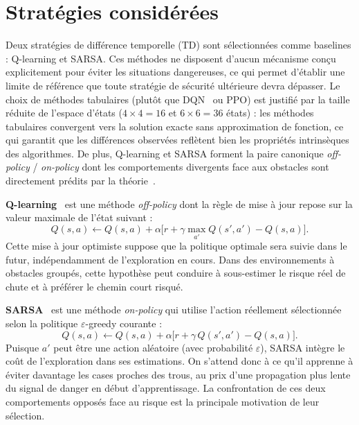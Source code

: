 \documentclass{article}
\begin{document}
\section{Stratégies considérées}

Deux stratégies de différence temporelle (TD) sont sélectionnées comme baselines : Q-learning et SARSA. Ces méthodes ne disposent d'aucun mécanisme conçu explicitement pour éviter les situations dangereuses, ce qui permet d'établir une limite de référence que toute stratégie de sécurité ultérieure devra dépasser. Le choix de méthodes tabulaires (plutôt que DQN~\citep{mnih2015} ou PPO) est justifié par la taille réduite de l'espace d'états ($4\times4 = 16$ et $6\times6 = 36$ états) : les méthodes tabulaires convergent vers la solution exacte sans approximation de fonction, ce qui garantit que les différences observées reflètent bien les propriétés intrinsèques des algorithmes. De plus, Q-learning et SARSA forment la paire canonique \textit{off-policy} / \textit{on-policy} dont les comportements divergents face aux obstacles sont directement prédits par la théorie~\citep{sutton2018}.

\textbf{Q-learning}~\citep{watkins1992} est une méthode \textit{off-policy} dont la règle de mise à jour repose sur la valeur maximale de l'état suivant :
\begin{equation}
  Q(s, a) \leftarrow Q(s, a) + \alpha \bigl[r + \gamma \max_{a'} Q(s', a') - Q(s, a)\bigr].
\end{equation}
Cette mise à jour optimiste suppose que la politique optimale sera suivie dans le futur, indépendamment de l'exploration en cours. Dans des environnements à obstacles groupés, cette hypothèse peut conduire à sous-estimer le risque réel de chute et à préférer le chemin court risqué.

\textbf{SARSA}~\citep{rummery1994} est une méthode \textit{on-policy} qui utilise l'action réellement sélectionnée selon la politique $\varepsilon$-greedy courante :
\begin{equation}
  Q(s, a) \leftarrow Q(s, a) + \alpha \bigl[r + \gamma\, Q(s', a') - Q(s, a)\bigr].
\end{equation}
Puisque $a'$ peut être une action aléatoire (avec probabilité $\varepsilon$), SARSA intègre le coût de l'exploration dans ses estimations. On s'attend donc à ce qu'il apprenne à éviter davantage les cases proches des trous, au prix d'une propagation plus lente du signal de danger en début d'apprentissage. La confrontation de ces deux comportements opposés face au risque est la principale motivation de leur sélection.
\end{document}
